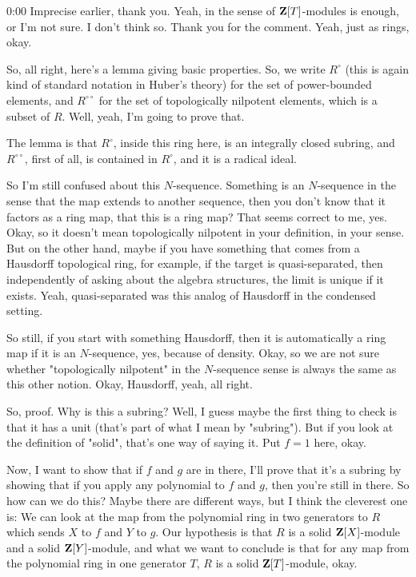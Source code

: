 \begin{unfinished}{0:00}
Imprecise earlier, thank you. Yeah, in the sense of $\mathbf Z[T]$-modules is enough, or I'm not sure. I don't think so. Thank you for the comment. Yeah, just as rings, okay.

So, all right, here's a lemma giving basic properties. So, we write $R^{\circ}$ (this is again kind of standard notation in Huber's theory) for the set of power-bounded elements, and $R^{\circ \circ}$ for the set of topologically nilpotent elements, which is a subset of $R$. Well, yeah, I'm going to prove that.

The lemma is that $R^{\circ}$, inside this ring here, is an integrally closed subring, and $R^{\circ \circ}$, first of all, is contained in $R^{\circ}$, and it is a radical ideal.

So I'm still confused about this $N$-sequence. Something is an $N$-sequence in the sense that the map extends to another sequence, then you don't know that it factors as a ring map, that this is a ring map? That seems correct to me, yes. Okay, so it doesn't mean topologically nilpotent in your definition, in your sense. But on the other hand, maybe if you have something that comes from a Hausdorff topological ring, for example, if the target is quasi-separated, then independently of asking about the algebra structures, the limit is unique if it exists. Yeah, quasi-separated was this analog of Hausdorff in the condensed setting.

So still, if you start with something Hausdorff, then it is automatically a ring map if it is an $N$-sequence, yes, because of density. Okay, so we are not sure whether "topologically nilpotent" in the $N$-sequence sense is always the same as this other notion. Okay, Hausdorff, yeah, all right.

So, proof. Why is this a subring? Well, I guess maybe the first thing to check is that it has a unit (that's part of what I mean by "subring"). But if you look at the definition of "solid", that's one way of saying it. Put $f=1$ here, okay.

Now, I want to show that if $f$ and $g$ are in there, I'll prove that it's a subring by showing that if you apply any polynomial to $f$ and $g$, then you're still in there. So how can we do this? Maybe there are different ways, but I think the cleverest one is: We can look at the map from the polynomial ring in two generators to $R$ which sends $X$ to $f$ and $Y$ to $g$. Our hypothesis is that $R$ is a solid $\mathbf Z[X]$-module and a solid $\mathbf Z[Y]$-module, and what we want to conclude is that for any map from the polynomial ring in one generator $T$, $R$ is a solid $\mathbf Z[T]$-module, okay.


\end{unfinished}
